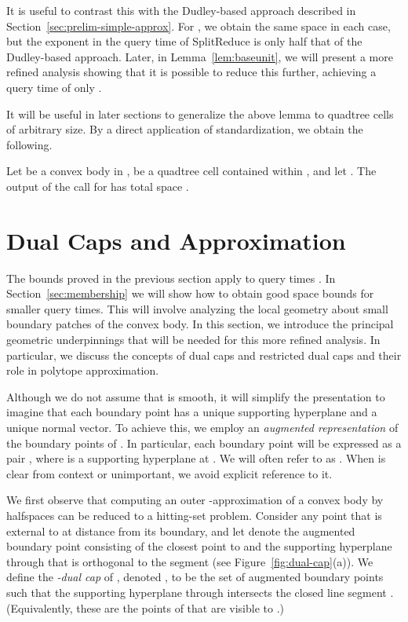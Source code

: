 \documentclass[11pt]{article}   \usepackage[letterpaper,hmargin=2.1cm,vmargin=3cm]{geometry}
\newcommand{\alg}{\textrm{SplitReduce}}
\begin{document}
It is useful to contrast this with the Dudley-based approach described in Section~\ref{sec:prelim-simple-approx}. For , we obtain the same  space in each case, but the exponent in the query time of {\alg} is only half that of the Dudley-based approach. Later, in Lemma~\ref{lem:baseunit}, we will present a more refined analysis showing that it is possible to reduce this further, achieving a query time of only .

It will be useful in later sections to generalize the above lemma to quadtree cells of arbitrary size. By a direct application of standardization, we obtain the following.

\begin{lemma} \label{lem:firstbound}
Let  be a convex body in ,  be a quadtree cell contained within , and let . The output of the call  for  has total space .
\end{lemma}


\section{Dual Caps and Approximation} \label{sec:cap}


The bounds proved in the previous section apply to query times . In Section~\ref{sec:membership} we will show how to obtain good space bounds for smaller query times. This will involve analyzing the local geometry about small boundary patches of the convex body. In this section, we introduce the principal geometric underpinnings that will be needed for this more refined analysis. In particular, we discuss the concepts of dual caps and restricted dual caps and their role in polytope approximation.

Although we do not assume that  is smooth, it will simplify the presentation to imagine that each boundary point has a unique supporting hyperplane and a unique normal vector. To achieve this, we employ an \emph{augmented representation} of the boundary points of . In particular, each boundary point  will be expressed as a pair , where  is a supporting hyperplane at . We will often refer to  as . When  is clear from context or unimportant, we avoid explicit reference to it.

We first observe that computing an outer -approximation of a convex body  by halfspaces can be reduced to a hitting-set problem. Consider any point  that is external to  at distance  from its boundary, and let  denote the augmented boundary point consisting of the closest point  to  and the supporting hyperplane through  that is orthogonal to the segment  (see Figure~\ref{fig:dual-cap}(a)). We define the \emph{-dual cap} of , denoted , to be the set of augmented boundary points  such that the supporting hyperplane  through  intersects the closed line segment . (Equivalently, these are the points of  that are visible to .) 
\end{document}
